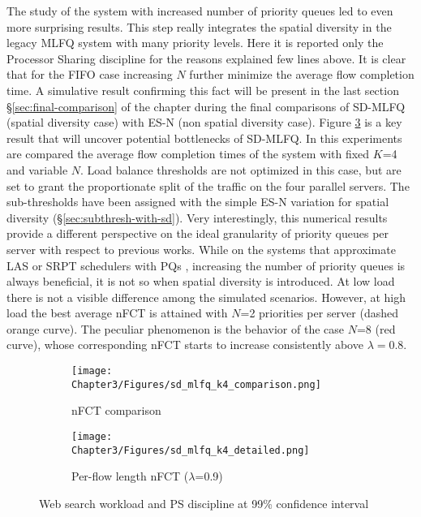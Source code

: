 The study of the system with increased number of priority queues led to even more surprising results. This step really integrates the spatial diversity in the legacy MLFQ system with many priority levels. Here it is reported only the Processor Sharing discipline for the reasons explained few lines above. It is clear that for the FIFO case increasing $N$ further minimize the average flow completion time. A simulative result confirming this fact will be present in the last section \S \ref{sec:final-comparison} of the chapter during the final comparisons of SD-MLFQ (spatial diversity case) with ES-N (non spatial diversity case). Figure \ref{fig:sdmlfq-variable-N} is a key result that will uncover potential bottlenecks of SD-MLFQ. In this experiments are compared the average flow completion times of the system with fixed $K$=4 and variable $N$. Load balance thresholds are not optimized in this case, but are set to grant the proportionate split of the traffic on the four parallel servers. The sub-thresholds have been assigned with the simple ES-N variation for spatial diversity (\S \ref{sec:subthresh-with-sd}). Very interestingly, this numerical results provide a different perspective on the ideal granularity of priority queues per server with respect to previous works. While on the systems that approximate LAS or SRPT schedulers with PQs  \cite{pias, pFabric}, increasing the number of priority queues is always beneficial, it is not so when spatial diversity is introduced. At low load there is not a visible difference among the simulated scenarios. However, at high load the best average nFCT is attained with $N$=2 priorities per server (dashed orange curve). The peculiar phenomenon is the behavior of the case $N$=8 (red curve), whose corresponding nFCT starts to increase consistently above $\lambda=0.8$. 
\begin{figure}
	\centering
	\begin{subfigure}{.5\textwidth}
		\centering
		\texttt{[image: Chapter3/Figures/sd\_mlfq\_k4\_comparison.png]}
		\caption{nFCT comparison}
		\label{fig:sdmlfq-variable-N-fct}
	\end{subfigure}%
	\hfill
	\begin{subfigure}{.5\textwidth}
		\centering
		\texttt{[image: Chapter3/Figures/sd\_mlfq\_k4\_detailed.png]}
		\caption{Per-flow length nFCT ($\lambda$=0.9)}
		\label{fig:sdmlfq-variable-N-fct-detailed}
	\end{subfigure}
	\caption{Web search workload and PS discipline at 99\% confidence interval}
	\label{fig:sdmlfq-variable-N}
\end{figure}

